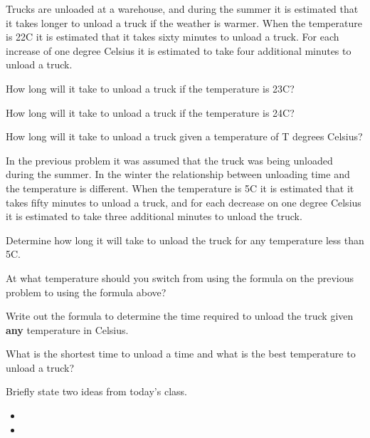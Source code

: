 \begin{problem}
\item Trucks are unloaded at a warehouse, and during the summer it is
  estimated that it takes longer to unload a truck if the weather is
  warmer. When the temperature is 22C it is estimated that it takes
  sixty minutes to unload a truck. For each increase of one degree
  Celsius it is estimated to take four additional minutes to unload a
  truck.
  \begin{subproblem}
    \item How long will it take to unload a truck if the temperature
      is 23C?
      \vspace{2em}
    \item How long will it take to unload a truck if the temperature
      is 24C?
      \vspace{2em}
    \item How long will it take to unload a truck given a temperature
      of T degrees Celsius?
      \vfill
  \end{subproblem}

  \clearpage

\item In the previous problem it was assumed that the truck was being
  unloaded during the summer. In the winter the relationship between
  unloading time and the temperature is different. When the
  temperature is 5C it is estimated that it takes fifty minutes to
  unload a truck, and for each decrease on one degree Celsius it is
  estimated to take three additional minutes to unload the truck.
  \begin{subproblem}
    \item Determine how long it will take to unload the truck for any
      temperature less than 5C.
      \vfill
    \item At what temperature should you switch from using the
      formula on the previous problem to using the formula above?
      \vfill
      \vfill
    \item Write out the formula to determine the time required to
      unload the truck given \textbf{any} temperature in Celsius.
      \vspace{3em}
    \item What is the shortest time to unload a time and what is the
      best temperature to unload a truck?  
      \vspace{2em}
  \end{subproblem}

\end{problem}

\postClass

\begin{problem}
\item Briefly state two ideas from today's class.
  \begin{itemize}
  \item 
  \item 
  \end{itemize}
\item 
  \begin{subproblem}
    \item
  \end{subproblem}
\end{problem}

